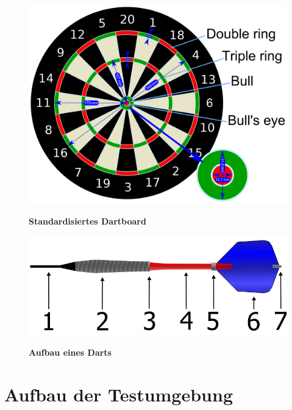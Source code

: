 \begin{figure}
\includegraphics[width=\textwidth]{media/Dartboard_Abmessungen}\\
\caption{\textbf{Standardisiertes Dartboard\cite{Board2016}}
}
\label{Fig:darts}
\end{figure}

\begin{figure}
\includegraphics[width=\textwidth]{media/Dart}\\
\caption{\textbf{Aufbau eines Darts\cite{dart2006}}
}
\label{Fig:darts}
\end{figure}

\section{Aufbau der Testumgebung}
\label{sec:setup}

